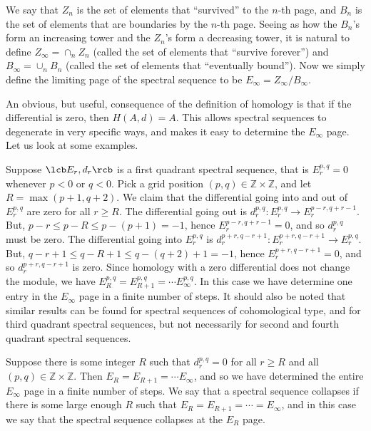 We say that $Z_n$ is the set of elements that ``survived'' to the $n$-th page, and $B_n$ is the set of elements that are boundaries by the $n$-th page. Seeing as how the $B_n$'s form an increasing tower and the $Z_n$'s form a decreasing tower, it is natural to define $Z_\infty = \cap_n Z_n$ (called the set of elements that ``survive forever'') and $B_\infty = \cup_n B_n$ (called the set of elements that ``eventually bound''). Now we simply define the limiting page of the spectral sequence to be $E_\infty = Z_\infty / B_\infty$. 

An obvious, but useful, consequence of the definition of homology is that if the differential is zero, then $H(A,d)=A$. This allows spectral sequences to degenerate in very specific ways, and makes it easy to determine the $E_\infty$ page. Let us look at some examples.

\begin{example}
Suppose $\lcb E_r,d_r \rcb$ is a first quadrant spectral sequence, that is $E^{p,q}_r = 0$ whenever $p<0$ or $q<0$. Pick a grid position $(p,q) \in \mathbb Z \times \mathbb Z$, and let $R = \max(p+1,q+2)$. We claim that the differential going into and out of $E^{p,q}_r$ are zero for all $r \geq R$. The differential going out is $d^{p,q}_r : E^{p,q}_r \rightarrow E^{p-r,q+r-1}_r$. But, $p-r \leq p-R \leq p-(p+1) = -1$, hence $E^{p-r,q+r-1}_r = 0$, and so $d_r^{p,q}$ must be zero. The differential going into $E_r^{p,q}$ is $d_r^{p+r,q-r+1} : E_r^{p+r,q-r+1} \rightarrow E_r^{p,q}$. But, $q-r+1 \leq q-R+1 \leq q-(q+2)+1 = -1$, hence $E_r^{p+r,q-r+1}=0$, and so $d_r^{p+r,q-r+1}$ is zero. Since homology with a zero differential does not change the module, we have $E_R^{p,q} = E_{R+1}^{p,q} = \cdots E_\infty^{p,q}$. In this case we have determine one entry in the $E_\infty$ page in a finite number of steps. It should also be noted that similar results can be found for spectral sequences of cohomological type, and for third quadrant spectral sequences, but not necessarily for second and fourth quadrant spectral sequences.
\end{example}

\begin{example}
Suppose there is some integer $R$ such that $d_r^{p,q} = 0$ for all $r \geq R$ and all $(p,q) \in \mathbb Z \times \mathbb Z$. Then $E_R = E_{R+1} = \cdots E_\infty$, and so we have determined the entire $E_\infty$ page in a finite number of steps. We say that a spectral sequence collapses if there is some large enough $R$ such that $E_R = E_{R+1} = \cdots = E_\infty$, and in this case we say that the spectral sequence collapses at the $E_R$ page.
\end{example}


